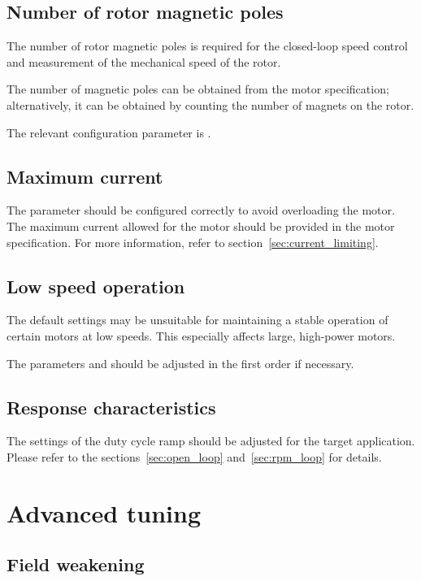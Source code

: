 \documentclass{zubaxdoc}
\begin{document}
	\subsection{Number of rotor magnetic poles}
	
	The number of rotor magnetic poles is required for the closed-loop speed control and
	measurement of the mechanical speed of the rotor.
	
	The number of magnetic poles can be obtained from the motor specification;
	alternatively, it can be obtained by counting the number of magnets on the rotor.
	
	The relevant configuration parameter is .
	
	\subsection{Maximum current}
	
	The parameter  should be configured correctly to avoid overloading the motor.
	The maximum current allowed for the motor should be provided in the motor specification.
	For more information, refer to section~\ref{sec:current_limiting}.
	
	\subsection{Low speed operation}
	
	The default settings may be unsuitable for maintaining a stable operation of certain motors at low speeds.
	This especially affects large, high-power motors.
	
	The parameters  and  should be adjusted in the first
	order if necessary.
	
	\subsection{Response characteristics}
	
	The settings of the duty cycle ramp should be adjusted for the target application.
	Please refer to the sections~\ref{sec:open_loop} and~\ref{sec:rpm_loop} for details.
	
	\section{Advanced tuning}
	
	\subsection{Field weakening}
	
\end{document}
